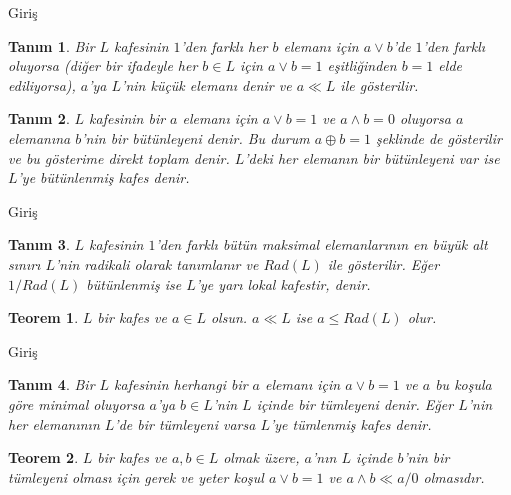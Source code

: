\documentclass[mathserif]{beamer}
\newtheorem*{teorem}{Teorem}
\newtheorem*{tanim}{Tanım}
\begin{document}
\begin{frame}{Giriş}

\begin{tanim}
     Bir $ L $ kafesinin $ 1 $'den farklı her $ b $ elemanı için $ a \vee b $'de $ 1 $'den
     farklı oluyorsa (diğer bir ifadeyle her $ b \in L $ için $ a \vee b = 1 $ eşitliğinden $ b = 1 $ elde ediliyorsa), 
     $ a $'ya $ L $'nin \textit{küçük elemanı} denir ve $ a \ll L $ ile gösterilir.
\end{tanim}
\begin{tanim}
     $ L $ kafesinin bir $ a $ elemanı için $ a \vee b = 1 $ ve $ a \wedge b = 0 $ oluyorsa
     $ a $ elemanına $ b $'nin bir \textit{bütünleyeni} denir. Bu durum $ a \oplus b = 1 $ şeklinde de gösterilir ve bu gösterime 
	\textit{direkt toplam} denir. $ L $'deki her elemanın bir bütünleyeni var 
     ise $ L $'ye \textit{bütünlenmiş kafes} denir.
\end{tanim}
\end{frame}




\begin{frame}{Giriş}
\begin{tanim}
     $L$ kafesinin $ 1 $'den farklı bütün maksimal elemanlarının en büyük alt sınırı $L$'nin radikali olarak tanımlanır ve $Rad(L)$ ile gösterilir. 
     Eğer $ 1/Rad(L) $ bütünlenmiş ise $L$'ye \emph{yarı lokal} kafestir, denir.
\end{tanim}


\begin{teorem}
 $ L $ bir kafes ve $ a \in L $ olsun. $ a \ll L $ ise $ a \leq Rad(L) $ olur.
\end{teorem}
\end{frame}




\begin{frame}{Giriş}
\begin{tanim}
     Bir $ L $ kafesinin herhangi bir $ a $ elemanı için $ a \vee b = 1 $ ve $ a $ bu koşula göre 
minimal oluyorsa $a$'ya $ b \in L$'nin $ L $ içinde bir \textit{tümleyeni} denir. Eğer $ L $'nin her elemanının $ L $'de 
bir tümleyeni varsa $ L $'ye \textit{tümlenmiş kafes} denir.
\end{tanim}


\begin{teorem}
  $ L $ bir kafes ve $ a,b  \in L $ olmak üzere, $ a $'nın $ L $ içinde $ b $'nin bir tümleyeni olması için gerek ve yeter koşul 
$ a \vee b =1 $ ve $ a \wedge b \ll a / 0 $ olmasıdır. 
\end{teorem}
\end{frame}
\end{document}
